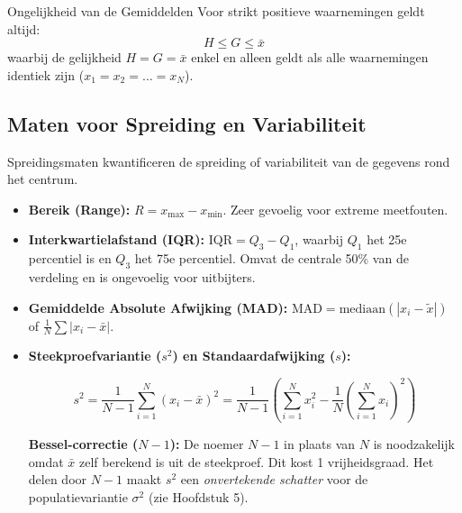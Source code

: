 \documentclass[11pt,a4paper]{article}
\begin{document}
\begin{theobox}{Ongelijkheid van de Gemiddelden}
Voor strikt positieve waarnemingen geldt altijd:
\begin{equation}
    H \le G \le \bar{x}
\end{equation}
waarbij de gelijkheid $H = G = \bar{x}$ enkel en alleen geldt als alle waarnemingen identiek zijn ($x_1 = x_2 = \ldots = x_N$).
\end{theobox}

\subsection{Maten voor Spreiding en Variabiliteit}
Spreidingsmaten kwantificeren de spreiding of variabiliteit van de gegevens rond het centrum.

\begin{itemize}[leftmargin=1.5em]
    \item \textbf{Bereik (Range):} $R = x_{\max} - x_{\min}$. Zeer gevoelig voor extreme meetfouten.
    \item \textbf{Interkwartielafstand (IQR):} $\text{IQR} = Q_3 - Q_1$, waarbij $Q_1$ het 25e percentiel is en $Q_3$ het 75e percentiel. Omvat de centrale 50\% van de verdeling en is ongevoelig voor uitbijters.
    \item \textbf{Gemiddelde Absolute Afwijking (MAD):} $\text{MAD} = \text{mediaan}(|x_i - \tilde{x}|)$ of $\frac{1}{N}\sum |x_i - \bar{x}|$.
    \item \textbf{Steekproefvariantie ($s^2$) en Standaardafwijking ($s$):}
    \begin{formulabox}
    \begin{equation}
        s^2 = \frac{1}{N-1} \sum_{i=1}^N (x_i - \bar{x})^2 = \frac{1}{N-1} \left( \sum_{i=1}^N x_i^2 - \frac{1}{N} \left(\sum_{i=1}^N x_i\right)^2 \right)
    \end{equation}
    \end{formulabox}
    \textbf{Bessel-correctie ($N-1$):} De noemer $N-1$ in plaats van $N$ is noodzakelijk omdat $\bar{x}$ zelf berekend is uit de steekproef. Dit kost 1 vrijheidsgraad. Het delen door $N-1$ maakt $s^2$ een \emph{onvertekende schatter} voor de populatievariantie $\sigma^2$ (zie Hoofdstuk 5).
\end{itemize}
\end{document}
